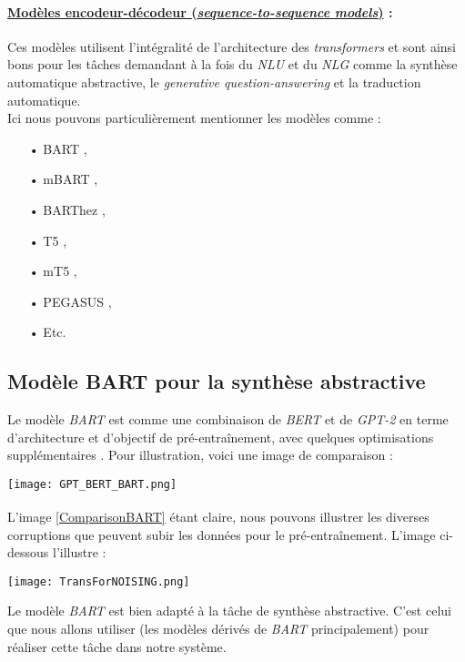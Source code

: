 \paragraph{\underline{Modèles encodeur-décodeur (\textit{sequence-to-sequence models})} :}
Ces modèles utilisent l'in\-té\-gra\-li\-té de l'architecture des \textit{transformers} et sont ainsi bons pour les tâches demandant à la fois du  \textit{NLU} et du \textit{NLG} comme la synthèse automatique abstractive, le \textit{generative question-answering} et la traduction automatique.\\
Ici nous pouvons particulièrement mentionner les modèles comme :
\begin{itemize}
\item[•] BART \cite{BART},
\item[•] mBART \cite{mBART_liu2020multilingual},
\item[•] BARThez \cite{eddine2020barthez},
\item[•] T5 \cite{T5-raffel2020exploring},
\item[•] mT5 \cite{mT5_xue2020mt5},
\item[•] PEGASUS \cite{PEGASUSzhang2020pegasus},
\item[•] Etc.
\end{itemize}

\subsection{Modèle BART pour la synthèse abstractive}\label{BARTmodel}
Le modèle \textit{BART} est comme une combinaison de \textit{BERT} \cite{BERT_devlin2018bert} et de \textit{GPT-2} \cite{GPT1_radford2018improving,GPT2_radford2019language} en terme d'architecture et d'objectif de pré-entraînement, avec quelques optimisations supplémentaires \cite{BART}.
Pour illustration, voici une image de comparaison :
\begin{center}
\texttt{[image: GPT\_BERT\_BART.png]}
\label{ComparisonBART}
\end{center}
$ _{ } $\\
L'image \ref{ComparisonBART} étant claire, nous pouvons illustrer les diverses corruptions que peuvent subir les données pour le pré-entraînement. L'image ci-dessous l'illustre :\newpage
\begin{center}
\texttt{[image: TransForNOISING.png]}
\end{center}
Le modèle \textit{BART} est bien adapté à la tâche de synthèse abstractive. C'est celui que nous allons utiliser (les modèles dérivés de \textit{BART} principalement) pour réaliser cette tâche dans notre système.
